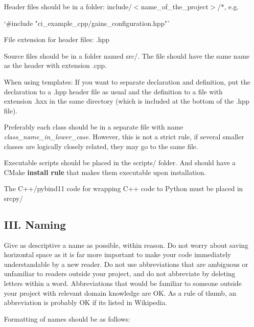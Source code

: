 \begin{DoxyItemize}
\item Header files should be in a folder\+: {\ttfamily include/$<$name\+\_\+of\+\_\+the\+\_\+project$>$/$\ast$}, e.\+g.
\begin{DoxyCode}
`#include "ci\_example\_cpp/gains\_configuration.hpp"` 
\end{DoxyCode}

\item File extension for header files\+: {\ttfamily .hpp}
\item Source files should be in a folder named {\ttfamily src/}. The file should have the same name as the header with extension {\ttfamily .cpp}.
\item When using templates\+: If you want to separate declaration and definition, put the declaration to a {\ttfamily .hpp} header file as usual and the definition to a file with extension {\ttfamily .hxx} in the same directory (which is included at the bottom of the {\ttfamily .hpp} file).
\item Preferably each class should be in a separate file with name {\itshape class\+\_\+name\+\_\+in\+\_\+lower\+\_\+case}. However, this is not a strict rule, if several smaller classes are logically closely related, they may go to the same file.
\item Executable scripts should be placed in the {\ttfamily scripts/} folder. And should have a C\+Make {\bfseries install rule} that makes them executable upon installation.
\item The C++/pybind11 code for wrapping C++ code to Python must be placed in {\ttfamily srcpy/}
\end{DoxyItemize}

\subsection*{I\+II. Naming}

Give as descriptive a name as possible, within reason. Do not worry about saving horizontal space as it is far more important to make your code immediately understandable by a new reader. Do not use abbreviations that are ambiguous or unfamiliar to readers outside your project, and do not abbreviate by deleting letters within a word. Abbreviations that would be familiar to someone outside your project with relevant domain knowledge are OK. As a rule of thumb, an abbreviation is probably OK if it\textquotesingle{}s listed in Wikipedia.

Formatting of names should be as follows\+:


